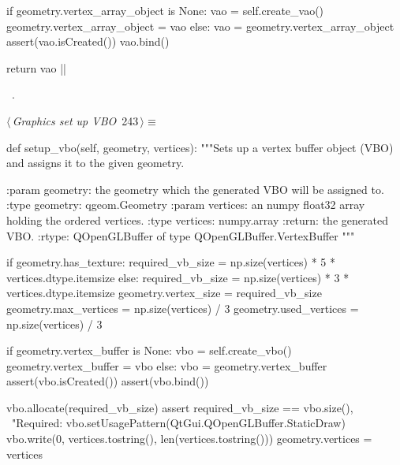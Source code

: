 \documentclass[%
    a4paper,    %
    justified,  %
    nobib,      %
    openany     %
]{tufte-book}
\makeatletter
\renewcommand{\label}[1]{\@tufte@label{##1}}%
\makeatother
\begin{document}
\begin{fullwidth}
\begin{flushleft}
\begin{minipage}{\linewidth}
\begin{pythoncode}
    if geometry.vertex_array_object is None:
        vao = self.create_vao()
        geometry.vertex_array_object = vao
    else:
        vao = geometry.vertex_array_object
    assert(vao.isCreated())
    vao.bind()

    return vao
|\NWsep|
\end{pythoncode}
\vspace{1.5ex}
\footnotesize
\begin{list}{}{\setlength{\itemsep}{-\parsep}\setlength{\itemindent}{-\leftmargin}}
\item \NWtxtMacroRefIn\ .

\item{}
\end{list}
\end{minipage}\vspace{4ex}
\end{flushleft}
\begin{flushleft} \small
\begin{minipage}{\linewidth}\label{scrap263}\raggedright\small
{} $\langle\,${\itshape Graphics set up VBO}\nobreak\ {\footnotesize {243}}$\,\rangle\equiv$
\vspace{-1ex}
\begin{pythoncode}
def setup_vbo(self, geometry, vertices):
    """Sets up a vertex buffer object (VBO) and assigns it to the given
    geometry.

    :param geometry: the geometry which the generated VBO will be assigned
                     to.
    :type geometry:  qgeom.Geometry
    :param vertices: an numpy float32 array holding the ordered vertices.
    :type vertices:  numpy.array
    :return:         the generated VBO.
    :rtype:          QOpenGLBuffer of type QOpenGLBuffer.VertexBuffer
    """

    if geometry.has_texture:
        required_vb_size   = np.size(vertices) * 5 * vertices.dtype.itemsize
    else:
        required_vb_size   = np.size(vertices) * 3 * vertices.dtype.itemsize
    geometry.vertex_size   = required_vb_size
    geometry.max_vertices  = np.size(vertices) / 3
    geometry.used_vertices = np.size(vertices) / 3

    if geometry.vertex_buffer is None:
        vbo = self.create_vbo()
        geometry.vertex_buffer = vbo
    else:
        vbo = geometry.vertex_buffer
    assert(vbo.isCreated())
    assert(vbo.bind())

    vbo.allocate(required_vb_size)
    assert required_vb_size == vbo.size(), \
        "Required: %
    vbo.setUsagePattern(QtGui.QOpenGLBuffer.StaticDraw)
    vbo.write(0, vertices.tostring(), len(vertices.tostring()))
    geometry.vertices = vertices


\end{pythoncode}
\end{minipage}
\end{flushleft}
\end{fullwidth}
\end{document}
